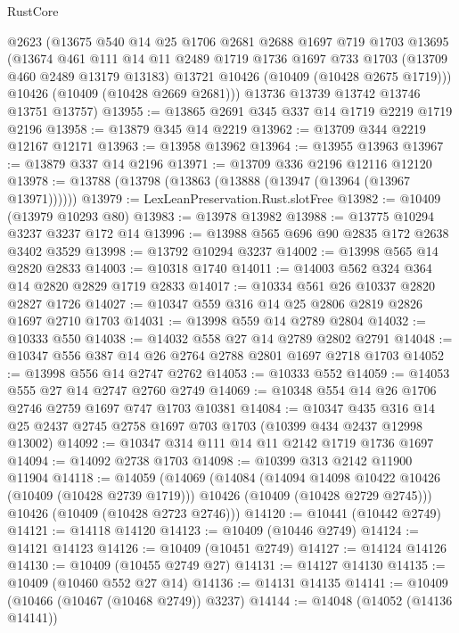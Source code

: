 \begin{lexlean}{RustCore}
\begin{coremodule}
      @2623
      (@13675
        @540
        @14
        @25
        @1706
        @2681
        @2688
        @1697
        @719
        @1703
        @13695
        (@13674
          @461
          @111
          @14
          @11
          @2489
          @1719
          @1736
          @1697
          @733
          @1703
          (@13709 @460 @2489 @13179 @13183)
          @13721
          @10426
          (@10409 (@10428 @2675 @1719)))
        @10426
        (@10409 (@10428 @2669 @2681)))
      @13736
      @13739
      @13742
      @13746
      @13751
      @13757)
@13955 := @13865 @2691 @345 @337 @14 @1719 @2219 @1719 @2196
@13958 := @13879 @345 @14 @2219
@13962 := @13709 @344 @2219 @12167 @12171
@13963 := @13958 @13962
@13964 := @13955 @13963
@13967 := @13879 @337 @14 @2196
@13971 := @13709 @336 @2196 @12116 @12120
@13978 := @13788 (@13798 (@13863 (@13888 (@13947 (@13964 (@13967 @13971))))))
@13979 := LexLeanPreservation.Rust.slotFree
@13982 := @10409 (@13979 @10293 @80)
@13983 := @13978 @13982
@13988 := @13775 @10294 @3237 @3237 @172 @14
@13996 := @13988 @565 @696 @90 @2835 @172 @2638 @3402 @3529
@13998 := @13792 @10294 @3237
@14002 := @13998 @565 @14 @2820 @2833
@14003 := @10318 @1740
@14011 := @14003 @562 @324 @364 @14 @2820 @2829 @1719 @2833
@14017 := @10334 @561 @26 @10337 @2820 @2827 @1726
@14027 := @10347 @559 @316 @14 @25 @2806 @2819 @2826 @1697 @2710 @1703
@14031 := @13998 @559 @14 @2789 @2804
@14032 := @10333 @550
@14038 := @14032 @558 @27 @14 @2789 @2802 @2791
@14048 := @10347 @556 @387 @14 @26 @2764 @2788 @2801 @1697 @2718 @1703
@14052 := @13998 @556 @14 @2747 @2762
@14053 := @10333 @552
@14059 := @14053 @555 @27 @14 @2747 @2760 @2749
@14069 := @10348 @554 @14 @26 @1706 @2746 @2759 @1697 @747 @1703 @10381
@14084 := @10347
    @435
    @316
    @14
    @25
    @2437
    @2745
    @2758
    @1697
    @703
    @1703
    (@10399 @434 @2437 @12998 @13002)
@14092 := @10347 @314 @111 @14 @11 @2142 @1719 @1736 @1697
@14094 := @14092 @2738 @1703
@14098 := @10399 @313 @2142 @11900 @11904
@14118 := @14059
    (@14069
      (@14084
        (@14094 @14098 @10422 @10426 (@10409 (@10428 @2739 @1719)))
        @10426
        (@10409 (@10428 @2729 @2745)))
      @10426
      (@10409 (@10428 @2723 @2746)))
@14120 := @10441 (@10442 @2749)
@14121 := @14118 @14120
@14123 := @10409 (@10446 @2749)
@14124 := @14121 @14123
@14126 := @10409 (@10451 @2749)
@14127 := @14124 @14126
@14130 := @10409 (@10455 @2749 @27)
@14131 := @14127 @14130
@14135 := @10409 (@10460 @552 @27 @14)
@14136 := @14131 @14135
@14141 := @10409 (@10466 (@10467 (@10468 @2749)) @3237)
@14144 := @14048 (@14052 (@14136 @14141))

\end{coremodule}
\end{lexlean}
